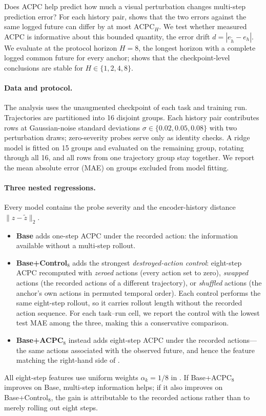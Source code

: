 \documentclass[10pt]{article}
\begin{document}
Does ACPC help predict how much a visual perturbation changes multi-step
prediction error? For each history pair, 
shows that the two errors against the same logged future can differ by at most
$\mathrm{ACPC}_H$. We test whether measured ACPC is informative about this
bounded quantity, the error drift $d=|e_{\tilde h}-e_h|$. We evaluate at the protocol horizon
$H=8$, the longest horizon with a complete logged common future for every
anchor;  shows that the
checkpoint-level conclusions are stable for $H\in\{1,2,4,8\}$.

\paragraph{Data and protocol.}
The analysis uses the unaugmented checkpoint of each task and training run.
Trajectories are partitioned into 16 disjoint groups. Each history pair
contributes rows at Gaussian-noise standard deviations
$\sigma\in\{0.02,0.05,0.08\}$ with two
perturbation draws; zero-severity probes serve only as identity checks. A
ridge model is fitted on 15 groups and evaluated on the remaining group,
rotating through all 16, and all rows from one trajectory group stay
together. We report the mean absolute error (MAE) on groups excluded from
model fitting.

\paragraph{Three nested regressions.}
Every model contains the probe severity and the encoder-history distance
$\|z-\tilde z\|_2$.
\begin{itemize}[leftmargin=1.4em]
  \item \textbf{Base} adds one-step ACPC under the recorded action: the
  information available without a multi-step rollout.
  \item \textbf{Base+Control$_8$} adds the strongest \emph{destroyed-action
  control}: eight-step ACPC recomputed with \emph{zeroed} actions (every
  action set to zero), \emph{swapped} actions (the recorded actions of a
  different trajectory), or \emph{shuffled} actions (the anchor's own actions
  in permuted temporal order). Each control performs the same eight-step
  rollout, so it carries rollout length without the recorded action sequence.
  For each task--run cell, we report the control with the lowest test MAE
  among the three, making this a conservative comparison.
  \item \textbf{Base+ACPC$_8$} instead adds eight-step ACPC under the
  recorded actions---the same actions associated with the observed future,
  and hence the feature matching the right-hand side of
  .
\end{itemize}
All eight-step features use uniform weights $\alpha_k=1/8$ in
. If Base+ACPC$_8$ improves on Base, multi-step information
helps; if it also improves on Base+Control$_8$, the gain is attributable to
the recorded actions rather than to merely rolling out eight steps.
\end{document}
